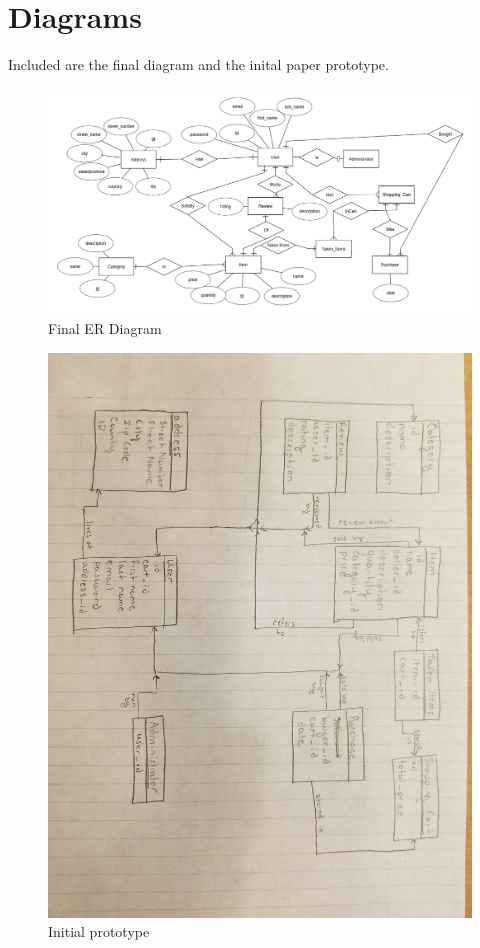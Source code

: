 \documentclass{article}[12pt]
\begin{document}
\section*{Diagrams}
Included are the final diagram and the inital paper prototype.
    \begin{figure}
        \centering
        \includegraphics[width=\textwidth]{erdplus-diagram.png}
        \caption{Final ER Diagram}
    \end{figure}

    \begin{figure}
        \centering
        \includegraphics[angle=90,origin=c,width=\textwidth]{originaldiagram.jpg}
        \caption{Initial prototype}
    \end{figure}
\end{document}
